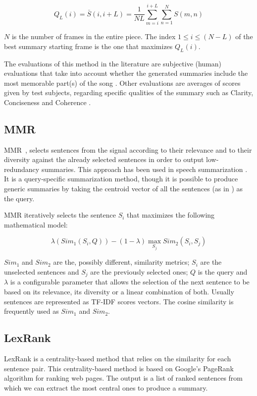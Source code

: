 \documentclass[11pt,onecolumn,draftcls]{IEEEtran}
\begin{document}
\begin{equation}
Q_{L}\left(i\right)=\bar{S}\left(i,i+L\right)=\frac{1}{NL}\sum_{m=i}^{i+L}\sum_{n=1}^{N}S\left(m,n\right)
\end{equation}

$N$ is the number of frames in the entire piece. The index $1\leq i\leq
\left(N-L\right)$ of the best summary starting frame is the one that maximizes
$Q_{L}\left(i\right)$.

The evaluations of this method in the literature are subjective (human)
evaluations that take into account whether the generated summaries include the
most memorable part(s) of the song \cite{Cooper2002}. Other evaluations are
averages of scores given by test subjects, regarding specific qualities of the
summary such as Clarity, Conciseness and Coherence \cite{Glaczynski2011}.

\subsection{\acl{MMR}\label{sub:mmr}}
\ac{MMR}~\cite{Carbonell1998}, selects sentences from the signal
according to their relevance and to their diversity against the already selected
sentences in order to output low-redundancy summaries. This approach has been
used in speech summarization \cite{Zechner2000,Murray2005}. It is a
query-specific summarization method, though it is possible to produce generic
summaries by taking the centroid vector of all the sentences (as in
\cite{Murray2005}) as the query.

\ac{MMR} iteratively selects the sentence $S_i$ that maximizes the following
mathematical model:

\begin{equation}
\lambda\left({Sim_{1}}\left(S_{i},Q\right)\right)-\left(1-\lambda\right)\max_{S_{j}}Sim_{2}\left(S_{i},S_{j}\right)
\end{equation}

$Sim_{1}$ and $Sim_{2}$ are the, possibly different, similarity metrics;
$S_{i}$ are the unselected sentences and $S_{j}$ are the previously selected
ones; $Q$ is the query and $\lambda$ is a configurable parameter that allows the
selection of the next sentence to be based on its relevance, its diversity or a
linear combination of both. Usually sentences are represented as \ac{TF-IDF}
scores vectors. The cosine similarity is frequently used as $Sim_{1}$ and $Sim_{2}$.

\subsection{LexRank\label{sub:lexrank}}
LexRank \cite{Erkan2004} is a centrality-based method that relies on the
similarity for each sentence pair. This centrality-based method is based on
Google's PageRank \cite{Brin1998} algorithm for ranking web pages. The output is
a list of ranked sentences from which we can extract the most central
ones to produce a summary.
\end{document}
